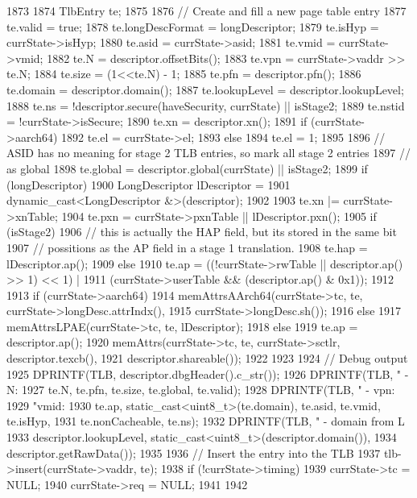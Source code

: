 \begin{DoxyCode}
1873 {
1874     TlbEntry te;
1875 
1876     // Create and fill a new page table entry
1877     te.valid          = true;
1878     te.longDescFormat = longDescriptor;
1879     te.isHyp          = currState->isHyp;
1880     te.asid           = currState->asid;
1881     te.vmid           = currState->vmid;
1882     te.N              = descriptor.offsetBits();
1883     te.vpn            = currState->vaddr >> te.N;
1884     te.size           = (1<<te.N) - 1;
1885     te.pfn            = descriptor.pfn();
1886     te.domain         = descriptor.domain();
1887     te.lookupLevel    = descriptor.lookupLevel;
1888     te.ns             = !descriptor.secure(haveSecurity, currState) || isStage2;
1889     te.nstid          = !currState->isSecure;
1890     te.xn             = descriptor.xn();
1891     if (currState->aarch64)
1892         te.el         = currState->el;
1893     else
1894         te.el         = 1;
1895 
1896     // ASID has no meaning for stage 2 TLB entries, so mark all stage 2 entries
1897     // as global
1898     te.global         = descriptor.global(currState) || isStage2;
1899     if (longDescriptor) {
1900         LongDescriptor lDescriptor =
1901             dynamic_cast<LongDescriptor &>(descriptor);
1902 
1903         te.xn |= currState->xnTable;
1904         te.pxn = currState->pxnTable || lDescriptor.pxn();
1905         if (isStage2) {
1906             // this is actually the HAP field, but its stored in the same bit
1907             // possitions as the AP field in a stage 1 translation.
1908             te.hap = lDescriptor.ap();
1909         } else {
1910            te.ap = ((!currState->rwTable || descriptor.ap() >> 1) << 1) |
1911                (currState->userTable && (descriptor.ap() & 0x1));
1912         }
1913         if (currState->aarch64)
1914             memAttrsAArch64(currState->tc, te, currState->longDesc.attrIndx(),
1915                             currState->longDesc.sh());
1916         else
1917             memAttrsLPAE(currState->tc, te, lDescriptor);
1918     } else {
1919         te.ap = descriptor.ap();
1920         memAttrs(currState->tc, te, currState->sctlr, descriptor.texcb(),
1921                  descriptor.shareable());
1922     }
1923 
1924     // Debug output
1925     DPRINTF(TLB, descriptor.dbgHeader().c_str());
1926     DPRINTF(TLB, " - N:%
1927             te.N, te.pfn, te.size, te.global, te.valid);
1928     DPRINTF(TLB, " - vpn:%
1929             "vmid:%
1930             te.ap, static_cast<uint8_t>(te.domain), te.asid, te.vmid, te.isHyp,
1931             te.nonCacheable, te.ns);
1932     DPRINTF(TLB, " - domain from L%
1933             descriptor.lookupLevel, static_cast<uint8_t>(descriptor.domain()),
1934             descriptor.getRawData());
1935 
1936     // Insert the entry into the TLB
1937     tlb->insert(currState->vaddr, te);
1938     if (!currState->timing) {
1939         currState->tc  = NULL;
1940         currState->req = NULL;
1941     }
1942 }
\end{DoxyCode}
